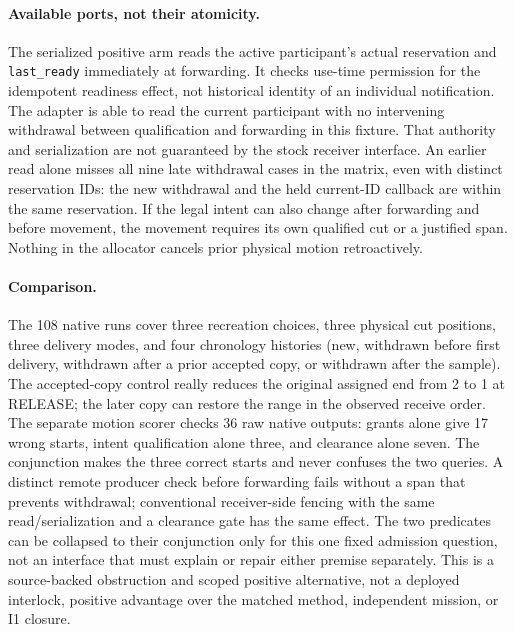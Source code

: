 \documentclass{article}
\begin{document}
\paragraph{Available ports, not their atomicity.}
The serialized positive arm reads the active participant's actual
reservation and \texttt{last\_ready} immediately at forwarding. It checks
use-time permission for the idempotent readiness effect, not historical
identity of an individual notification. The adapter is able to read the
current participant with no intervening withdrawal between qualification
and forwarding in this fixture. That authority and serialization are not
guaranteed by the stock receiver interface. An earlier read alone misses
all nine late withdrawal cases in the matrix, even with distinct
reservation IDs: the new withdrawal and the held current-ID callback are
within the same reservation. If the legal intent can also change after
forwarding and before movement, the movement requires its own qualified
cut or a justified span. Nothing in the allocator cancels prior physical
motion retroactively.

\paragraph{Comparison.}
The 108 native runs cover three recreation choices, three physical cut
positions, three delivery modes, and four chronology histories
(new, withdrawn before first delivery, withdrawn after a prior accepted
copy, or withdrawn after the sample). The accepted-copy control really
reduces the original assigned end from 2 to 1 at RELEASE; the later
copy can restore the range in the observed receive order.
The separate motion scorer checks 36 raw native outputs: grants alone
give 17 wrong starts, intent qualification alone three, and clearance
alone seven. The conjunction makes the three correct starts and never
confuses the two queries. A distinct remote producer check before
forwarding fails without a span that prevents withdrawal; conventional
receiver-side fencing with the same read/serialization and a clearance
gate has the same effect. The two predicates can be collapsed to their
conjunction only for this one fixed admission question, not an interface
that must explain or repair either premise separately.
This is a source-backed obstruction and scoped positive alternative,
not a deployed interlock, positive advantage over the matched method,
independent mission, or I1 closure.
\end{document}
